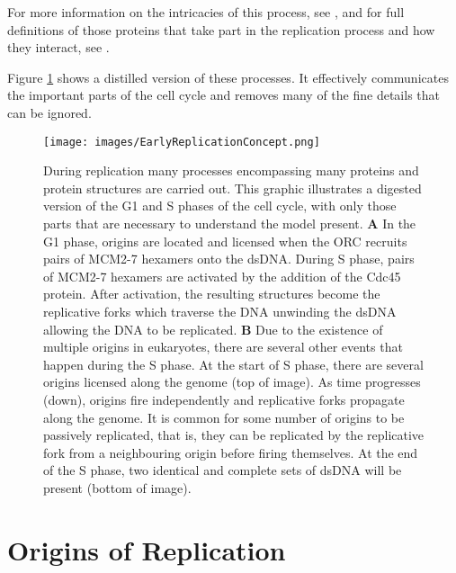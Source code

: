 		For more information on the intricacies of this process, see \cite{OriginsReview}, and for full definitions of those proteins that take part in the replication process and how they interact, see \cite{PurifiedProteins}.
		
	Figure \ref{fig:EarlyReplicationConcept} shows a distilled version of these processes. It effectively communicates the important parts of the cell cycle and removes many of the fine details that can be ignored.
	
	\begin{figure}[tbh]
		\begin{center}
			\texttt{[image: images/EarlyReplicationConcept.png]}
		\end{center}
			\caption[Events During Replication]{\label{fig:EarlyReplicationConcept} During replication many processes encompassing many proteins and protein structures are carried out.
				This graphic illustrates a digested version of the G1 and S phases of the cell cycle, with only those parts that are necessary to understand the model present.
				\textbf{A} In the G1 phase, origins are located and licensed when the ORC recruits pairs of MCM2-7 hexamers onto the dsDNA.
					During S phase, pairs of MCM2-7 hexamers are activated by the addition of the Cdc45 protein.
					After activation, the resulting structures become the replicative forks which traverse the DNA unwinding the dsDNA allowing the DNA to be replicated.
				\textbf{B} Due to the existence of multiple origins in eukaryotes, there are several other events that happen during the S phase.
					At the start of S phase, there are several origins licensed along the genome (top of image).
					As time progresses (down), origins fire independently and replicative forks propagate along the genome.
					It is common for some number of origins to be passively replicated, that is, they can be replicated by the replicative fork from a neighbouring origin before firing themselves.
					At the end of the S phase, two identical and complete sets of dsDNA will be present (bottom of image).}
	\end{figure}
	
	
	\section{Origins of Replication}
	\label{sec:Origins}
	
